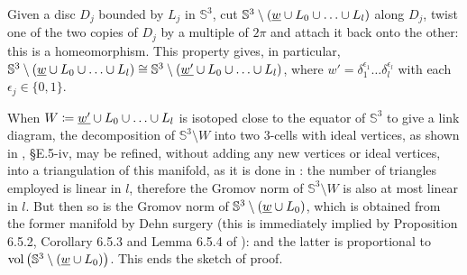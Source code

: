 Given a disc $D_j$ bounded by $L_j$ in $\mathbb S^3$, cut $\mathbb S^3\setminus (\underline{w}\cup L_0\cup\ldots \cup L_l)$ along $D_j$, twist one of the two copies of $D_j$ by a multiple of $2\pi$ and attach it back onto the other: this is a homeomorphism. This property gives, in particular, $\mathbb S^3\setminus (\underline{w}\cup L_0\cup\ldots \cup L_l)\cong \mathbb S^3\setminus (\underline{w'}\cup L_0\cup\ldots \cup L_l)$, where $w'=\delta_1^{\epsilon_1}\ldots \delta_l^{\epsilon_l}$ with each $\epsilon_j\in\{0,1\}$.

When $W\coloneqq \underline{w'}\cup L_0\cup\ldots \cup L_l$ is isotoped close to the equator of $\mathbb S^3$ to give a link diagram, the decomposition of $\mathbb S^3\setminus W$ into two 3-cells with ideal vertices, as shown in \cite{benedetti}, \S E.5-iv, may be refined, without adding any new vertices or ideal vertices, into a triangulation of this manifold, as it is done in \cite{lackenby}: the number of triangles employed is linear in $l$, therefore the Gromov norm of $\mathbb S^3\setminus W$ is also at most linear in $l$. But then so is the Gromov norm of $\mathbb S^3\setminus (\underline{w} \cup L_0)$, which is obtained from the former manifold by Dehn surgery (this is immediately implied by Proposition 6.5.2, Corollary 6.5.3 and Lemma 6.5.4 of \cite{thurstonnotes}): and the latter is proportional to $\mathrm{vol}\left(\mathbb S^3\setminus (\underline{w} \cup L_0)\right)$. This ends the sketch of proof.